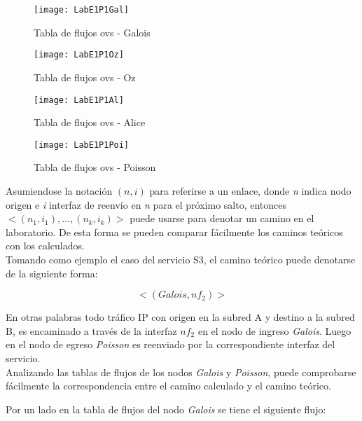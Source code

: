\newpage
\begin{figure}[ht!] 
\centering    
\texttt{[image: LabE1P1Gal]}
\caption[Tabla de flujos ovs - Galois]{Tabla de flujos ovs - Galois}
\label{fig:CU1P1DumpFlows1}
\end{figure}

\begin{figure}[h!] 
\centering    
\texttt{[image: LabE1P1Oz]}
\caption[Tabla de flujos ovs - Oz]{Tabla de flujos ovs - Oz}
\label{fig:CU1P1DumpFlows2}
\end{figure}

\begin{figure}[h!] 
\centering    
\texttt{[image: LabE1P1Al]}
\caption[Tabla de flujos ovs - Alice]{Tabla de flujos ovs - Alice}
\label{fig:CU1P1DumpFlows3}
\end{figure}

\begin{figure}[h!] 
\centering    
\texttt{[image: LabE1P1Poi]}
\caption[Tabla de flujos ovs - Poisson]{Tabla de flujos ovs - Poisson}
\label{fig:CU1P1DumpFlows4}
\end{figure}

\newpage
Asumiendose la notaci\'on $(n, i)$ para referirse a un enlace, donde \textit{n} indica nodo origen e \textit{i} interfaz de reenvío en \textit{n} para el próximo salto, entonces $<(n_1, i_1), \dots, (n_k, i_k)>$ puede usarse para denotar un camino en el laboratorio. De esta forma se pueden comparar f\'acilmente los caminos te\'oricos con los calculados.\\

Tomando como ejemplo el caso del servicio S3, el camino te\'orico puede denotarse de la siguiente forma:
 
$$<(Galois, nf_2)>$$

En otras palabras todo tr\'afico IP con origen en la subred A y destino a la subred B, es encaminado a través de la interfaz $nf_2$ en el nodo de ingreso \textit{Galois}. Luego en el nodo de egreso \textit{Poisson} es reenviado por la correspondiente interfaz del servicio.\\

Analizando las tablas de flujos de los nodos \textit{Galois} y \textit{Poisson}, puede comprobarse fácilmente la correspondencia entre el camino calculado y el camino te\'orico.

Por un lado en la tabla de flujos del nodo \textit{Galois} se tiene el siguiente flujo:

